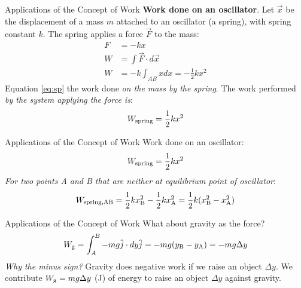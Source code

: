 \documentclass{beamer}
\begin{document}
\begin{frame}{Applications of the Concept of Work}
\textbf{Work done on an oscillator}.  Let $\vec{x}$ be the displacement of a mass $m$ attached to an oscillator (a spring), with spring constant $k$.  The spring applies a force $\vec{F}$ to the mass:
\begin{align}
F &= -kx \\
W &= \int \vec{F} \cdot d\vec{x} \\
W &= -k\int_{AB} x dx = -\frac{1}{2}k x^2 \label{eq:sp}
\end{align}
Equation \ref{eq:sp} the work done \textit{on the mass by the spring}.  The work performed \textit{by the system applying the force is}:
\begin{equation}
W_{\rm spring} = \frac{1}{2}k x^2
\end{equation}
\end{frame}

\begin{frame}{Applications of the Concept of Work}
Work done on an oscillator:
\begin{equation}
W_{\rm spring} = \frac{1}{2}k x^2
\end{equation}
\textit{For two points A and B that are neither at equilibrium point of oscillator}:
\begin{equation}
W_{\rm spring,AB} = \frac{1}{2}k x_{\rm B}^2 - \frac{1}{2}k x_{\rm A}^2 = \frac{1}{2}k(x_{\rm B}^2 - x_{\rm A}^2)
\end{equation}
\end{frame}

\begin{frame}{Applications of the Concept of Work}
What about gravity as the force?
\begin{equation}
W_{\rm g} = \int_{A}^{B} -mg \hat{j} \cdot dy \hat{j} = -mg(y_{\rm B} - y_{\rm A}) = -mg\Delta y
\end{equation}
\textit{Why the minus sign?}  Gravity does negative work if we raise an object $\Delta y$.  We contribute $W_{\rm g} = mg\Delta y$ (J) of energy to raise an object $\Delta y$ against gravity.
\end{frame}
\end{document}
